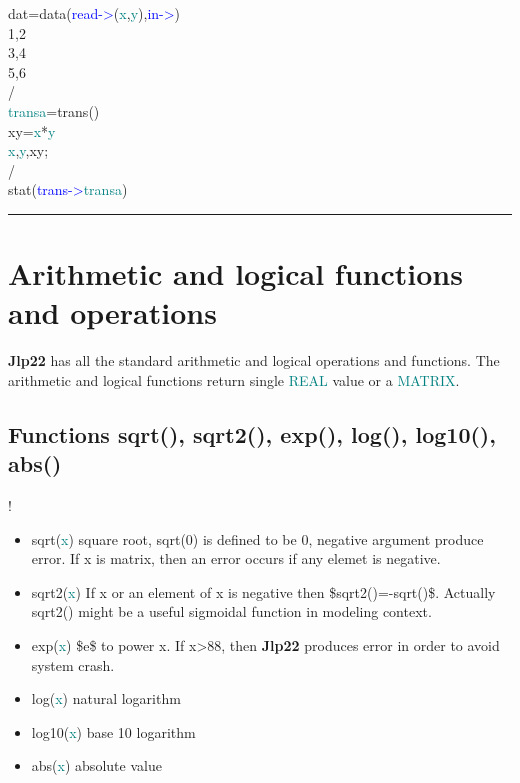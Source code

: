 {\begin{example}[comoptex]
\label{comoptex} 
\noindent dat=\textcolor{VioletRed}{data}(\textcolor{blue}{read->}(\textcolor{teal}{x},\textcolor{teal}{y}),\textcolor{blue}{in->})\\ 
1,2\\ 
3,4\\ 
5,6\\ 
/  \\ 
\textcolor{teal}{transa}=\textcolor{VioletRed}{trans}()\\ 
xy=\textcolor{teal}{x}*\textcolor{teal}{y}\\ 
\textcolor{teal}{x},\textcolor{teal}{y},xy;\\ 
/                                          \\ 
\textcolor{VioletRed}{stat}(\textcolor{blue}{trans->}\textcolor{teal}{transa})\\ 
\end{example} 
\vspace{-7mm} \rule{5cm}{0.1pt} 
\onehalfspacing 
\section{Arithmetic and logical functions and operations} 
\label{arith} 
\textbf{Jlp22} has all the standard arithmetic and logical operations and functions. 
The arithmetic and logical functions return single \textcolor{teal}{REAL} value or a \textcolor{teal}{MATRIX}. 
\subsection{Functions \textcolor{VioletRed}{sqrt}(), \textcolor{VioletRed}{sqrt2}(), \textcolor{VioletRed}{exp}(), \textcolor{VioletRed}{log}(), \textcolor{VioletRed}{log10}(), \textcolor{VioletRed}{abs}()} 
\label{arfu1} 
! 
\begin{itemize} 
\item \textcolor{VioletRed}{sqrt}(\textcolor{teal}{x}) square root, \textcolor{VioletRed}{sqrt}(0) is defined to be 0, negative argument produce error. 
If {x} is matrix, then an error occurs if any elemet is negative. 
\item \textcolor{VioletRed}{sqrt2}(\textcolor{teal}{x}) If {x} or an element of {x} is negative then \$\textcolor{VioletRed}{sqrt2}()=-\textcolor{VioletRed}{sqrt}()\$. Actually \textcolor{VioletRed}{sqrt2}() might be a 
useful sigmoidal function in modeling context. 
\item \textcolor{VioletRed}{exp}(\textcolor{teal}{x}) \$e\$ to power {x}. If {x}>88, then \textbf{Jlp22} produces error in order to avoid system 
crash. 
\item \textcolor{VioletRed}{log}(\textcolor{teal}{x}) natural logarithm 
\item \textcolor{VioletRed}{log10}(\textcolor{teal}{x}) base 10 logarithm 
\item \textcolor{VioletRed}{abs}(\textcolor{teal}{x}) absolute value 
\end{itemize} 
}
